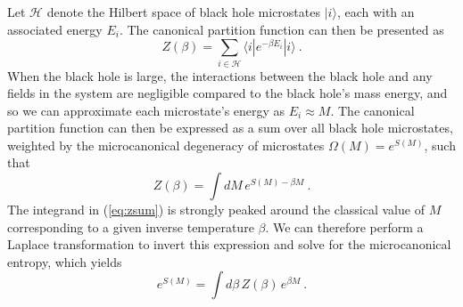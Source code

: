 \documentclass[12pt]{article}
\begin{document}
Let $\mathcal{H}$ denote the Hilbert space of black hole microstates $|i\rangle$, each with an associated energy $E_i$.  The canonical partition function can then be presented as
\begin{equation}
	Z(\beta) = \sum_{i \in \mathcal{H}} \langle i | e^{-\beta E_i} | i\rangle~.
\label{eq:grandtrace}
\end{equation}
When the black hole is large, the interactions between the black hole and any fields in the system are negligible compared to the black hole's mass energy, and so we can approximate each microstate's energy as $E_i \approx M$.  The canonical partition function can then be expressed as a sum over all black hole microstates, weighted by the microcanonical degeneracy of microstates $\Omega(M) = e^{S(M)}$, such that
\begin{equation}
	Z(\beta) = \int dM\, e^{S(M) - \beta M}~.
\label{eq:zsum}
\end{equation}
The integrand in (\ref{eq:zsum}) is strongly peaked around the classical value of $M$ corresponding to a given inverse temperature $\beta$.  We can therefore perform a Laplace transformation to invert this expression and solve for the microcanonical entropy, which yields
\begin{equation}
	e^{S(M)} = \int d\beta\, Z(\beta)\, e^{\beta M}~.
\label{eq:smc}
\end{equation}
\end{document}
